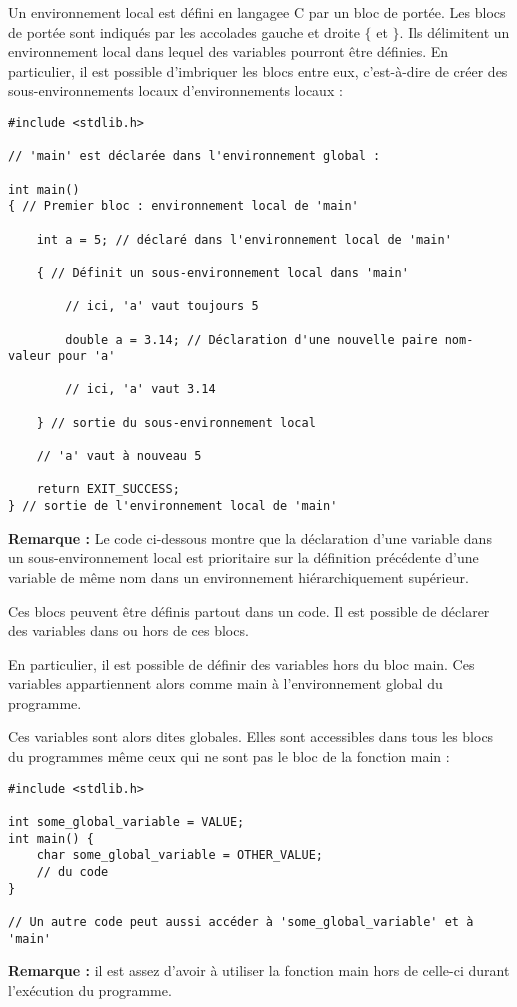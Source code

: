 \documentclass[../../../main.tex]{subfiles}
\begin{document}
Un environnement local est défini en langagee C par un bloc de portée. Les blocs de portée sont indiqués par les accolades gauche et droite $\{$ et $\}$. Ils délimitent un environnement local dans lequel des variables pourront être définies. En particulier, il est possible d'imbriquer les blocs entre eux, c'est-à-dire de créer des sous-environnements locaux d'environnements locaux :
\begin{verbatim}
#include <stdlib.h>

// 'main' est déclarée dans l'environnement global :

int main()
{ // Premier bloc : environnement local de 'main'

	int a = 5; // déclaré dans l'environnement local de 'main'

	{ // Définit un sous-environnement local dans 'main'

		// ici, 'a' vaut toujours 5
		
		double a = 3.14; // Déclaration d'une nouvelle paire nom-valeur pour 'a'
		
		// ici, 'a' vaut 3.14
	
	} // sortie du sous-environnement local

	// 'a' vaut à nouveau 5
	
	return EXIT_SUCCESS;
} // sortie de l'environnement local de 'main'

\end{verbatim}
\textbf{Remarque :} Le code ci-dessous montre que la déclaration d'une variable dans un sous-environnement local est prioritaire sur la définition précédente d'une variable de même nom dans un environnement hiérarchiquement supérieur.

Ces blocs peuvent être définis partout dans un code. Il est possible de déclarer des variables dans ou hors de ces blocs.
 
En particulier, il est possible de définir des variables hors du bloc \textsf{main}. Ces variables appartiennent alors comme \textsf{main} à l'environnement global du programme.

Ces variables sont alors dites globales. Elles sont accessibles dans tous les blocs du programmes même ceux qui ne sont pas le bloc de la fonction \textsf{main} :
\begin{verbatim}
#include <stdlib.h>

int some_global_variable = VALUE;
int main() {
	char some_global_variable = OTHER_VALUE;
	// du code
}

// Un autre code peut aussi accéder à 'some_global_variable' et à 'main'
\end{verbatim}
\textbf{Remarque :} il est assez d'avoir à utiliser la fonction \textsf{main} hors de celle-ci durant l'exécution du programme.
\end{document}
